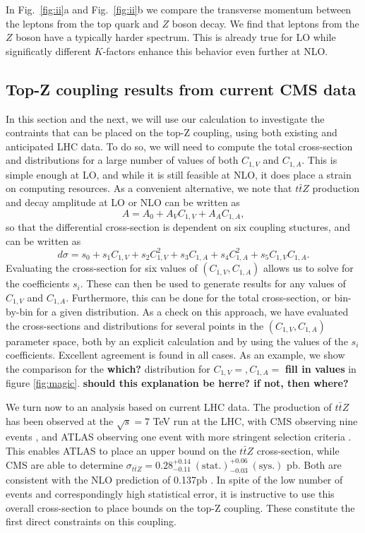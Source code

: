 \documentclass[preprint]{JHEP3} %
\def\ttbZ{t\bar{t}Z}
\begin{document}
In Fig.~\ref{fig:ii}a and Fig.~\ref{fig:ii}b we compare the transverse momentum between the leptons from the top quark and $Z$ boson decay.
We find that leptons from the $Z$ boson have a typically harder spectrum. 
This is already true for LO while significatly different $K$-factors enhance this behavior even further at NLO.

\subsection{Top-Z coupling results from current CMS data}
In this section and the next, we will use our calculation to investigate the contraints that can be placed on the top-Z coupling, using both existing and anticipated LHC data. To do so, we will need to compute the total cross-section and distributions for a large number of values of both $C_{1,V}$ and $C_{1,A}$. This is simple enough at LO, and while it is still feasible at NLO, it does place a strain on computing resources. As a convenient alternative, we note that $\ttbZ$ production and decay amplitude at LO or NLO can be written as
\begin{equation}
A = A_0 + A_V C_{1,V} + A_A C_{1,A},
\end{equation}
so that the differential cross-section is dependent on six coupling stuctures, and can be written as
\begin{equation}
d\sigma = s_0 +s_1C_{1,V} + s_2C_{1,V}^2 +s_3 C_{1,A}+s_4C_{1,A}^2+s_5C_{1,V}C_{1,A}.
\end{equation}
Evaluating the cross-section for six values of $(C_{1,V},C_{1,A})$ allows us to solve for the coefficients $s_i$. These can then be used to generate results for any values of $C_{1,V}$ and $C_{1,A}$. Furthermore, this can be done for the total cross-section, or bin-by-bin for a given distribution. As a check on this approach, we have evaluated the cross-sections and distributions for several points in the $(C_{1,V},C_{1,A})$ parameter space, both by an explicit calculation and by using the values of the $s_i$ coefficients. Excellent agreement is found in all cases. As an example, we show the comparison for the {\bf which?} distribution for $C_{1,V}=, C_{1,A}=$ {\bf fill in values} in figure \ref{fig:magic}. {\bf should this explanation be herre? if not, then where?}

We turn now to an analysis based on current LHC data. The production of $\ttbZ$ has been observed at the $\sqrt{s}=7$ TeV run at the LHC, with CMS observing nine events \cite{Chatrchyan:2013qca}, and ATLAS observing one event with more stringent selection criteria \cite{ATLAS-CONF-2012-126}. This enables ATLAS to place an upper bound on the $\ttbZ$ cross-section, while CMS are able to determine $\sigma_{\ttbZ} = 0.28^{+0.14}_{-0.11}~\mathrm{(stat.)}^{+0.06}_{-0.03}~ \mathrm{(sys.)}$ pb. Both are consistent with the NLO prediction of 0.137pb \cite{Garzelli:2011is}. In spite of the low number of events and correspondingly high statistical error, it is instructive to use this overall cross-section to place bounds on the top-Z coupling. These constitute the first direct constraints on this coupling.
\end{document}
